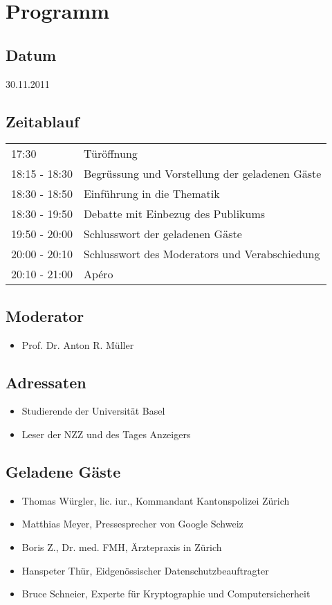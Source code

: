 \section{Programm}
\subsection*{Datum}
30.11.2011

\subsection*{Zeitablauf}
\begin{tabular}{ll}
17:30	& Türöffnung\\
18:15 - 18:30 & Begrüssung und Vorstellung der geladenen Gäste \\
18:30 - 18:50 & Einführung in die Thematik \\
18:30 - 19:50 & Debatte mit Einbezug des Publikums\\
19:50 - 20:00 & Schlusswort der geladenen Gäste\\
20:00 - 20:10 & Schlusswort des Moderators und Verabschiedung\\
20:10 - 21:00 & Apéro\\
\end{tabular}

\subsection*{Moderator}
\begin{itemize}
 \item Prof. Dr. Anton R. Müller
\end{itemize}

\subsection*{Adressaten}
\begin{itemize}
 \item Studierende der Universität Basel
 \item Leser der NZZ und des Tages Anzeigers
\end{itemize}


\subsection*{Geladene Gäste}
\begin{itemize}
\item Thomas Würgler, lic. iur., Kommandant Kantonspolizei Zürich
\item Matthias Meyer, Pressesprecher von Google Schweiz
\item Boris Z., Dr. med. FMH, Ärztepraxis in Zürich
\item Hanspeter Thür, Eidgenössischer Datenschutzbeauftragter
\item Bruce Schneier, Experte für Kryptographie und Computersicherheit
\end{itemize}

